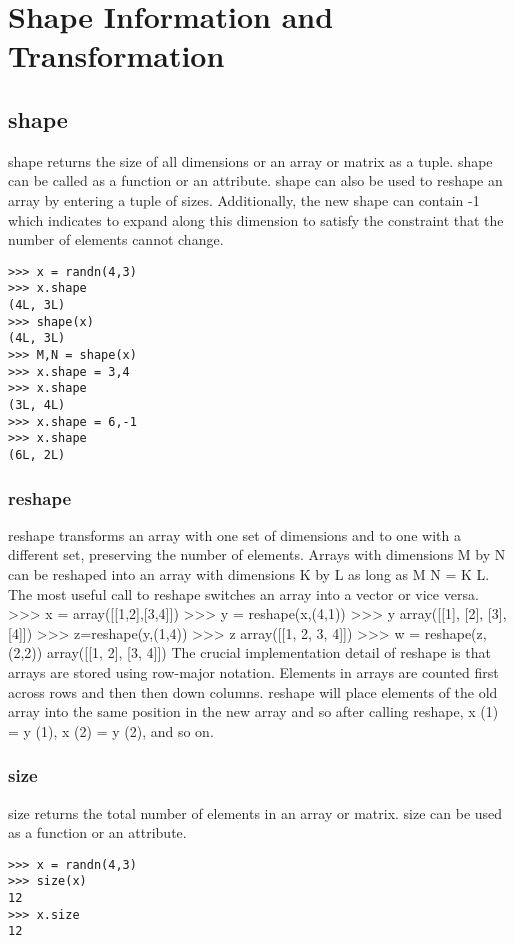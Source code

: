\documentclass[KSmain.tex]{subfiles}
\begin{document}
 


\section{Shape Information and Transformation}
\subsection{shape}

shape returns the size of all dimensions or an array or matrix as a tuple. shape can be called as a function
or an attribute. shape can also be used to reshape an array by entering a tuple of sizes. Additionally, the
new shape can contain -1 which indicates to expand along this dimension to satisfy the constraint that
the number of elements cannot change.
\begin{verbatim}
>>> x = randn(4,3)
>>> x.shape
(4L, 3L)
>>> shape(x)
(4L, 3L)
>>> M,N = shape(x)
>>> x.shape = 3,4
>>> x.shape
(3L, 4L)
>>> x.shape = 6,-1
>>> x.shape
(6L, 2L)
\end{verbatim}
\subsubsection{reshape}

reshape transforms an array with one set of dimensions and to one with a different set, preserving the
number of elements. Arrays with dimensions M by N can be reshaped into an array with dimensions K
by L as long as M N = K L. The most useful call to reshape switches an array into a vector or vice versa.
>>> x = array([[1,2],[3,4]])
>>> y = reshape(x,(4,1))
>>> y
array([[1],
[2],
[3],
[4]])
>>> z=reshape(y,(1,4))
>>> z
array([[1, 2, 3, 4]])
>>> w = reshape(z,(2,2))
array([[1, 2],
[3, 4]])
The crucial implementation detail of reshape is that arrays are stored using row-major notation. Elements
in arrays are counted first across rows and then then down columns. reshape will place elements of the
old array into the same position in the new array and so after calling reshape, x (1) = y (1), x (2) = y (2),
and so on.
\subsubsection{size}
size returns the total number of elements in an array or matrix. size can be used as a function or an
attribute.
\begin{verbatim}
>>> x = randn(4,3)
>>> size(x)
12
>>> x.size
12
\end{verbatim}
\end{document}
